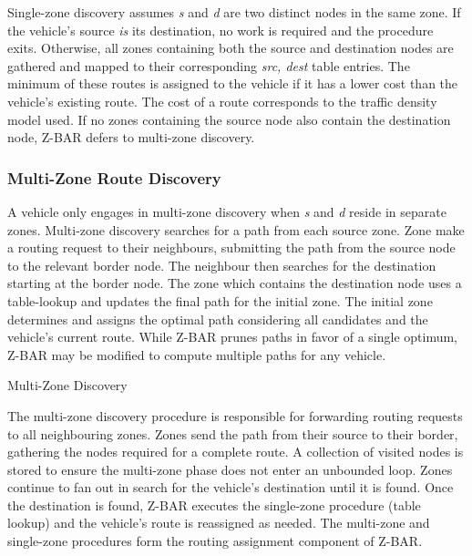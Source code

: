 \documentclass[conference]{IEEEtran}
\begin{document}
Single-zone discovery assumes \textit{s} and \textit{d} are two distinct nodes in the same zone. If the vehicle's source \textit{is} its destination, no work is required and the procedure exits. Otherwise, all zones containing both the source and destination nodes are gathered and mapped to their corresponding \textit{src, dest} table entries. The minimum of these routes is assigned to the vehicle if it has a lower cost than the vehicle's existing route. The cost of a route corresponds to the traffic density model used. If no zones containing the source node also contain the destination node, Z-BAR defers to multi-zone discovery.

\subsubsection{Multi-Zone Route Discovery}

A vehicle only engages in multi-zone discovery when \textit{s} and \textit{d} reside in separate zones. Multi-zone discovery searches for a path from each source zone. Zone make a routing request to their neighbours, submitting the path from the source node to the relevant border node. The neighbour then searches for the destination starting at the border node. The zone which contains the destination node uses a table-lookup and updates the final path for the initial zone. The initial zone determines and assigns the optimal path considering all candidates and the vehicle's current route. While Z-BAR prunes paths in favor of a single optimum, Z-BAR may be modified to compute multiple paths for any vehicle.

\begin{algorithm}[H]
  \caption{Multi-Zone Discovery}
  \label{route_discovery_multi_zone}
  \begin{algorithmic}[1]
      \EndFor
    \EndFor
  \EndFor
  \EndProcedure
  \end{algorithmic}
\end{algorithm}

The multi-zone discovery procedure is responsible for forwarding routing requests to all neighbouring zones. Zones send the path from their source to their border, gathering the nodes required for a complete route. A collection of visited nodes is stored to ensure the multi-zone phase does not enter an unbounded loop. Zones continue to fan out in search for the vehicle's destination until it is found. Once the destination is found, Z-BAR executes the single-zone procedure (table lookup) and the vehicle's route is reassigned as needed. The multi-zone and single-zone procedures form the routing assignment component of Z-BAR.
\end{document}
